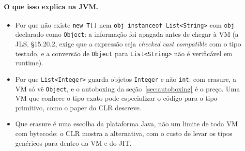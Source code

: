 \paragraph{O que isso explica na JVM.}
\begin{itemize}
\item Por que não existe \texttt{new T[]} nem
  \texttt{obj instanceof List<String>} com \texttt{obj} declarado como
  \texttt{Object}: a informação foi apagada antes de chegar à VM (a JLS,
  §15.20.2, exige que a expressão seja \emph{checked cast compatible} com
  o tipo testado, e a conversão de \texttt{Object} para
  \texttt{List<String>} não é verificável em runtime).
\item Por que \texttt{List<Integer>} guarda objetos \texttt{Integer} e
  não \texttt{int}: com erasure, a VM só vê \texttt{Object}, e o
  autoboxing da seção~\ref{sec:autoboxing} é o preço. Uma VM que conhece
  o tipo exato pode especializar o código para o tipo primitivo, como o
  paper do CLR descreve.
\item Que erasure é uma escolha da plataforma Java, não um limite de
  toda VM com bytecode: o CLR mostra a alternativa, com o custo de levar
  os tipos genéricos para dentro da VM e do JIT.
\end{itemize}
